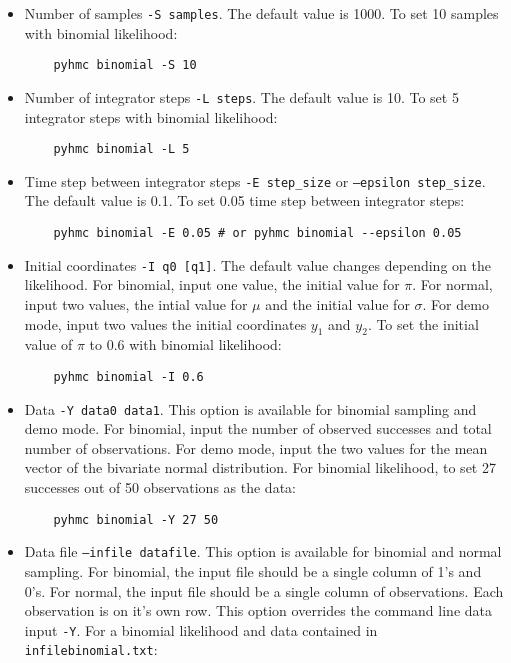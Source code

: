 \documentclass[10pt,letterpaper]{article}
\begin{document}
\begin{itemize} 
	\item Number of samples \texttt{-S samples}.  The default value is 1000.  
		To set 10 samples with binomial likelihood:

\begin{verbatim}
	pyhmc binomial -S 10
\end{verbatim}

	\item Number of integrator steps \texttt{-L steps}.  The default value is
		10.  To set 5 integrator steps with binomial likelihood:

\begin{verbatim}
	pyhmc binomial -L 5
\end{verbatim}
	
	\item Time step between integrator steps \texttt{-E step\_size} or
		\texttt{--epsilon step\_size}.  The default value is
		0.1.  To set 0.05 time step between integrator steps:

\begin{verbatim}
	pyhmc binomial -E 0.05 # or pyhmc binomial --epsilon 0.05
\end{verbatim}

	\item Initial coordinates \texttt{-I q0 [q1]}.  The default value changes
		depending on the likelihood.  For binomial, input one value, the
		initial value for $\pi$.  For normal, input two values, the intial
		value for $\mu$ and the initial value for $\sigma$.  For demo mode,
		input two values the initial coordinates $y_1$ and $y_2$.  To set the
		initial value of $\pi$ to 0.6 with binomial likelihood:

\begin{verbatim}
	pyhmc binomial -I 0.6
\end{verbatim}

	\item Data \texttt{-Y data0 data1}.  This option is available for binomial
		sampling and demo mode.  For binomial, input the number of observed
		successes and total number of observations.  For demo mode, input the
		two values for the mean vector of the bivariate normal distribution.
		For binomial likelihood, to set 27 successes out of 50 observations as
		the data:

\begin{verbatim}
	pyhmc binomial -Y 27 50
\end{verbatim}

	\item Data file \texttt{--infile datafile}.  This option is available for
		binomial and normal sampling.  For binomial, the input file should be a
		single column of 1's and 0's.  For normal, the input file should be a
		single column of observations.  Each observation is on it's own row.
		This option overrides the command line data input \texttt{-Y}.  For a
		binomial likelihood and data contained in \texttt{infilebinomial.txt}:


\end{itemize}
\end{document}

